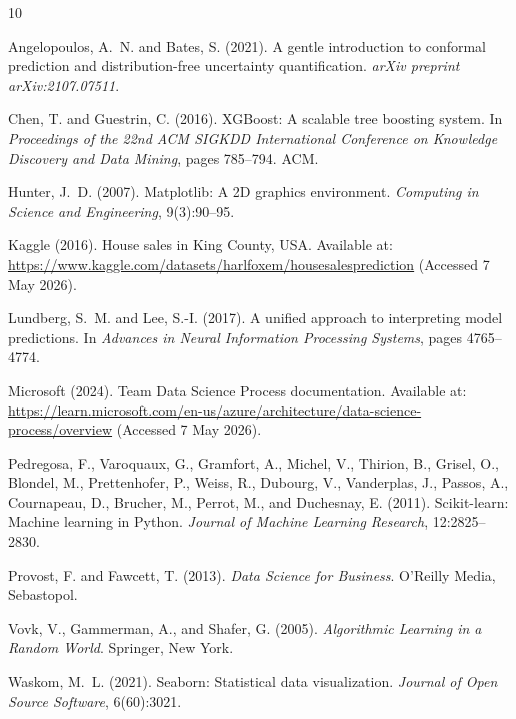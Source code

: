 \documentclass[12pt,a4paper]{article}
\begin{document}
\newpage
\begin{thebibliography}{10}

Angelopoulos, A.~N. and Bates, S. (2021).
\newblock A gentle introduction to conformal prediction and distribution-free uncertainty quantification.
\newblock \emph{arXiv preprint arXiv:2107.07511}.

Chen, T. and Guestrin, C. (2016).
\newblock XGBoost: A scalable tree boosting system.
\newblock In \emph{Proceedings of the 22nd ACM SIGKDD International Conference on Knowledge Discovery and Data Mining}, pages 785--794. ACM.

Hunter, J.~D. (2007).
\newblock Matplotlib: A 2D graphics environment.
\newblock \emph{Computing in Science and Engineering}, 9(3):90--95.

Kaggle (2016).
\newblock House sales in King County, USA.
\newblock Available at: \url{https://www.kaggle.com/datasets/harlfoxem/housesalesprediction} (Accessed 7 May 2026).

Lundberg, S.~M. and Lee, S.-I. (2017).
\newblock A unified approach to interpreting model predictions.
\newblock In \emph{Advances in Neural Information Processing Systems}, pages 4765--4774.

Microsoft (2024).
\newblock Team Data Science Process documentation.
\newblock Available at: \url{https://learn.microsoft.com/en-us/azure/architecture/data-science-process/overview} (Accessed 7 May 2026).

Pedregosa, F., Varoquaux, G., Gramfort, A., Michel, V., Thirion, B., Grisel, O., Blondel, M., Prettenhofer, P., Weiss, R., Dubourg, V., Vanderplas, J., Passos, A., Cournapeau, D., Brucher, M., Perrot, M., and Duchesnay, E. (2011).
\newblock Scikit-learn: Machine learning in Python.
\newblock \emph{Journal of Machine Learning Research}, 12:2825--2830.

Provost, F. and Fawcett, T. (2013).
\newblock \emph{Data Science for Business}.
\newblock O'Reilly Media, Sebastopol.

Vovk, V., Gammerman, A., and Shafer, G. (2005).
\newblock \emph{Algorithmic Learning in a Random World}.
\newblock Springer, New York.

Waskom, M.~L. (2021).
\newblock Seaborn: Statistical data visualization.
\newblock \emph{Journal of Open Source Software}, 6(60):3021.

\end{thebibliography}
\end{document}

